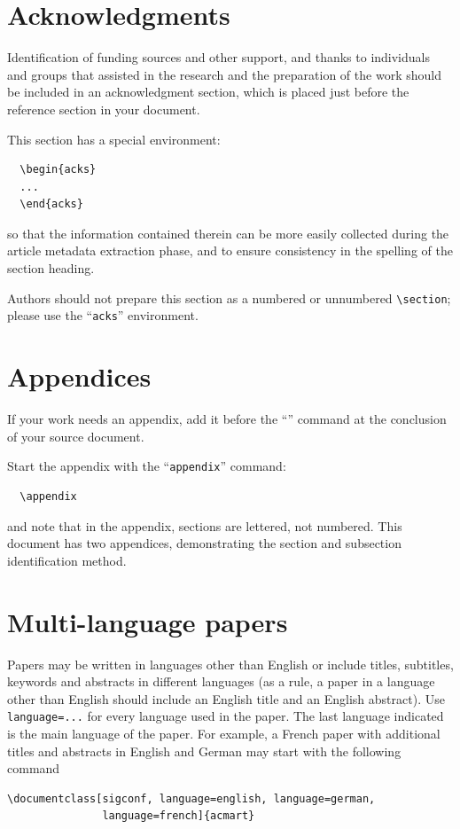 \section{Acknowledgments}

Identification of funding sources and other support, and thanks to
individuals and groups that assisted in the research and the
preparation of the work should be included in an acknowledgment
section, which is placed just before the reference section in your
document.

This section has a special environment:
\begin{verbatim}
  \begin{acks}
  ...
  \end{acks}
\end{verbatim}
so that the information contained therein can be more easily collected
during the article metadata extraction phase, and to ensure
consistency in the spelling of the section heading.

Authors should not prepare this section as a numbered or unnumbered {\verb|\section|}; please use the ``{\verb|acks|}'' environment.

\section{Appendices}

If your work needs an appendix, add it before the
``\verb||'' command at the conclusion of your source
document.

Start the appendix with the ``\verb|appendix|'' command:
\begin{verbatim}
  \appendix
\end{verbatim}
and note that in the appendix, sections are lettered, not
numbered. This document has two appendices, demonstrating the section
and subsection identification method.

\section{Multi-language papers}

Papers may be written in languages other than English or include
titles, subtitles, keywords and abstracts in different languages (as a
rule, a paper in a language other than English should include an
English title and an English abstract).  Use \verb|language=...| for
every language used in the paper.  The last language indicated is the
main language of the paper.  For example, a French paper with
additional titles and abstracts in English and German may start with
the following command
\begin{verbatim}
\documentclass[sigconf, language=english, language=german,
               language=french]{acmart}
\end{verbatim}

